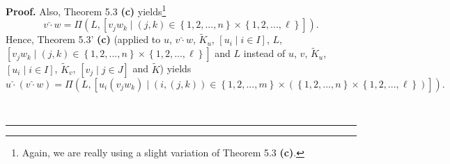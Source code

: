 \documentclass[numbers=enddot,12pt,final,onecolumn,notitlepage]{scrartcl}%
\newenvironment{proof}[1][Proof]{\noindent\textbf{#1.} }{\ \rule{0.5em}{0.5em}}
\begin{document}
\begin{proof}
Also, Theorem 5.3 \textbf{(c)} yields\footnote{Again, we are really using a
slight variation of Theorem 5.3 \textbf{(c)}.}%
\[
v\widehat{\cdot}w=\Pi\left(  L,\left[  v_{j}w_{k}\mid\left(  j,k\right)
\in\left\{  1,2,...,n\right\}  \times\left\{  1,2,...,\ell\right\}  \right]
\right)  .
\]
Hence, Theorem 5.3' \textbf{(c)} (applied to $u$, $v\widehat{\cdot}w$,
$\widetilde{K}_{u}$, $\left[  u_{i}\mid i\in I\right]  $, $L$, $\left[
v_{j}w_{k}\mid\left(  j,k\right)  \in\left\{  1,2,...,n\right\}
\times\left\{  1,2,...,\ell\right\}  \right]  $ and $L$ instead of $u$, $v$,
$\widetilde{K}_{u}$, $\left[  u_{i}\mid i\in I\right]  $, $\widetilde{K}_{v}$,
$\left[  v_{j}\mid j\in J\right]  $ and $\widetilde{K}$) yields%
\[
u\widehat{\cdot}\left(  v\widehat{\cdot}w\right)  =\Pi\left(  L,\left[
u_{i}\left(  v_{j}w_{k}\right)  \mid\left(  i,\left(  j,k\right)  \right)
\in\left\{  1,2,...,m\right\}  \times\left(  \left\{  1,2,...,n\right\}
\times\left\{  1,2,...,\ell\right\}  \right)  \right]  \right)  .
\]



\end{proof}
\end{document}
